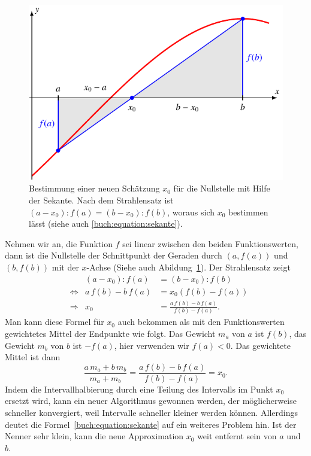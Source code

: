 \begin{figure}
\centering
\includegraphics{chapters/20-gleichungen/figures/sekante.pdf}
\caption{Bestimmung einer neuen Schätzung $x_0$ für die Nullstelle
mit Hilfe der Sekante.
Nach dem Strahlensatz ist $(a-x_0):f(a) = (b-x_0):f(b)$, woraus
sich $x_0$ bestimmen lässt (siehe auch \eqref{buch:equation:sekante}).
\label{buch:figure:sekante}}
\end{figure}

Nehmen wir an, die Funktion $f$ sei linear zwischen den beiden
Funktionswerten, dann ist die Nullstelle der Schnittpunkt
der Geraden durch $(a,f(a))$ und $(b,f(b))$ mit der $x$-Achse
(Siehe auch Abildung~\ref{buch:figure:sekante}).
Der Strahlensatz zeigt
%
%
\[
\begin{aligned}
&&
(a-x_0) : f(a)
&=
(b - x_0) : f(b)
\\
&\Leftrightarrow&
a\,f(b) - b\,f(a)
&=
x_0(f(b)-f(a))
\\
&\Rightarrow&
x_0
&=
\frac{a\,f(b)-b\,f(a)}{f(b)-f(a)}.
\end{aligned}
\]
Man kann diese Formel für $x_0$ auch bekommen als mit den
Funktionswerten gewichtetes Mittel der Endpunkte wie folgt.
Das Gewicht $m_a$ von $a$ ist $f(b)$, das Gewicht $m_b$ von
$b$ ist $-f(a)$, hier verwenden wir $f(a)<0$.
%
%
Das gewichtete Mittel ist dann
\begin{equation}
\frac{a\,m_a+b\,m_b}{m_a+m_b}
=
\frac{a\,f(b)-b\,f(a)}{f(b)-f(a)}=x_0.
\label{buch:equation:sekante}
\end{equation}
Indem die Intervallhalbierung durch eine Teilung des
Intervalls im Punkt $x_0$ ersetzt wird, kann ein neuer Algorithmus
gewonnen werden, der möglicherweise schneller konvergiert, weil
Intervalle schneller kleiner werden können.
Allerdings deutet die Formel~\eqref{buch:equation:sekante} auf
ein weiteres Problem hin.
Ist der Nenner sehr klein, kann die neue Approximation $x_0$ weit
entfernt sein von $a$ und $b$.

